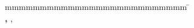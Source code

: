 \begin{titlepage}
\begin{center}


		\vspace{12mm}	\departmentPhrase{} \department\\
    \vspace{0mm}		\locationUniversityPhrase{} \locationUniversity\\
		\vspace{12mm}	\documentAuthorPhrase\\
		\vspace{3mm}		{\large\textbf \documentAuthor}\\
		\vspace{12mm}	\releaseDate\\
	\end{center}
	\vfill
	\begin{spacing}{1.2}
	\begin{tabbing}
		mmmmmmmmmmmmmmmmmmmmmmmmmm             \= \kill
		\textbf{\documentPeriodPhrase}       \>  \documentPeriod\\
		\textbf{\matriculationNumberPhrase, \coursePhrase}  \>  \matriculationNumber, \course\\


	\end{tabbing}
	\end{spacing}
\end{titlepage}
